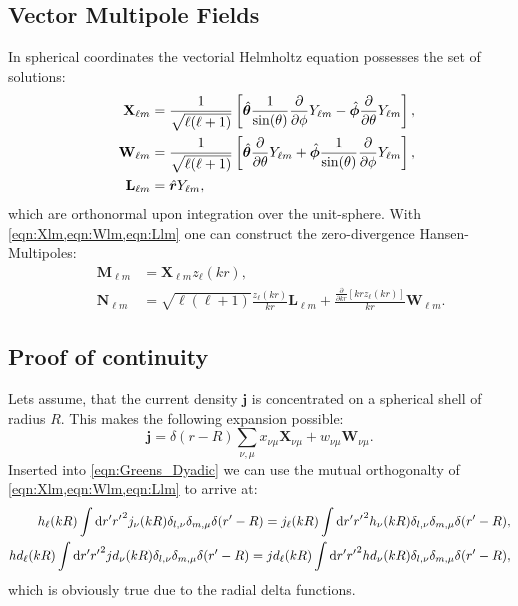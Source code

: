 \subsection{Vector Multipole Fields}
In spherical coordinates the vectorial Helmholtz equation possesses the set of
solutions:
\begin{align}
&& \mathbf{X}_{\ell m} &= \frac{1}{\sqrt{\ell(\ell+1)}} \left[
\hat{\bm{\theta}} \frac{1}{\sin(\theta)} \frac{\partial}{\partial \phi} Y_{\ell m} -
\hat{\bm{\phi}} \frac{\partial}{\partial \theta} Y_{\ell m}
\right], \label{eqn:Xlm}\\
&& \mathbf{W}_{\ell m} &= \frac{1}{\sqrt{\ell(\ell+1)}} \left[
\hat{\bm{\theta}} \frac{\partial}{\partial \theta} Y_{\ell m} +
\hat{\bm{\phi}} \frac{1}{\sin(\theta)} \frac{\partial}{\partial \phi} Y_{\ell m} 
\right], \label{eqn:Wlm}\\
&& \mathbf{L}_{\ell m} &= \hat{\bm{r}} Y_{\ell m},\label{eqn:Llm}
\end{align}
which are orthonormal upon integration over the unit-sphere. With \cref{eqn:Xlm,eqn:Wlm,eqn:Llm} one can construct the zero-divergence Hansen-Multipoles:
\begin{align}
&& \mathbf{M}_{\ell m} &= \mathbf{X}_{\ell m} z_\ell(kr),
\label{eqn:Mlm} \\
&& \mathbf{N}_{\ell m} &= \sqrt{\ell(\ell+1)} \frac{z_\ell(kr)}{kr} \mathbf{L}_{\ell m}+
\frac{\frac{\partial}{\partial kr}\left[kr z_\ell(kr)\right]}{kr}\mathbf{W}_{\ell m}. \label{eqn:Nlm}
\end{align}

\subsection{Proof of continuity}
\label{sec:Gproof}
Lets assume, that the current density $\mathbf{j}$ is concentrated on a spherical shell of radius $R$. This makes the following expansion possible:
\begin{equation}
\mathbf{j} = \delta(r-R)\sum_{\nu,\mu} x_{\nu \mu} \mathbf{X}_{\nu \mu} + w_{\nu \mu} \mathbf{W}_{\nu \mu}.
\end{equation}
Inserted into \cref{eqn:Greens_Dyadic} we can use the mutual orthogonalty of \cref{eqn:Xlm,eqn:Wlm,eqn:Llm} to arrive at:
\begin{align}
h_\ell(kR) \int \mathrm{d} r' {r'}^2j_\nu(kR)\delta_{l, \nu}\delta_{m,\mu} \delta(r'-R) 
= 
j_\ell(kR) \int \mathrm{d} r' {r'}^2h_\nu(kR)\delta_{l, \nu}\delta_{m,\mu} \delta(r'-R),\\
hd_\ell(kR) \int \mathrm{d} r' {r'}^2jd_\nu(kR)\delta_{l, \nu}\delta_{m,\mu} \delta(r'-R) 
= 
jd_\ell(kR) \int \mathrm{d} r' {r'}^2hd_\nu(kR)\delta_{l, \nu}\delta_{m,\mu} \delta(r'-R),
\end{align}
which is obviously true due to the radial delta functions.
